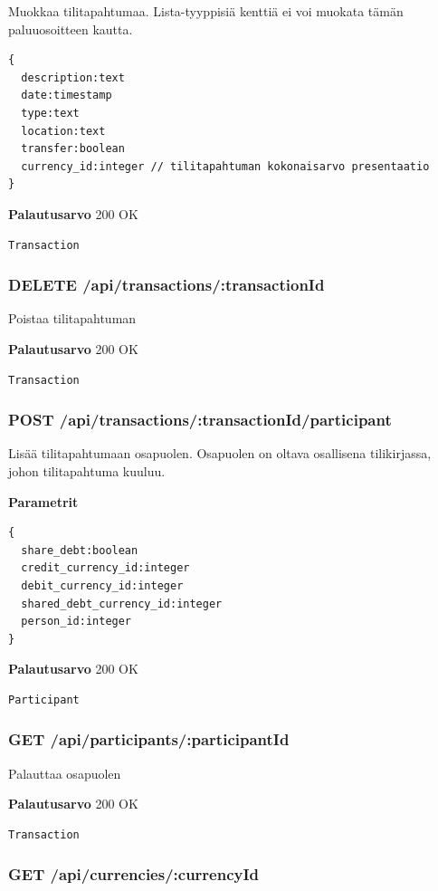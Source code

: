 \documentclass[a4paper,parskip=half]{scrartcl}
\begin{document}
Muokkaa tilitapahtumaa. Lista-tyyppisiä kenttiä ei voi muokata tämän
paluuosoitteen kautta.

\begin{Verbatim}
{
  description:text
  date:timestamp
  type:text
  location:text
  transfer:boolean
  currency_id:integer // tilitapahtuman kokonaisarvo presentaatio
}
\end{Verbatim}

\textbf{Palautusarvo}
200 OK
\begin{Verbatim}
Transaction
\end{Verbatim}

\subsubsection{DELETE /api/transactions/:transactionId}

Poistaa tilitapahtuman

\textbf{Palautusarvo}
200 OK
\begin{Verbatim}
Transaction
\end{Verbatim}

\subsubsection{POST /api/transactions/:transactionId/participant}

Lisää tilitapahtumaan osapuolen. Osapuolen on oltava osallisena tilikirjassa,
johon tilitapahtuma kuuluu.

\textbf{Parametrit}
\begin{Verbatim}
{
  share_debt:boolean
  credit_currency_id:integer
  debit_currency_id:integer
  shared_debt_currency_id:integer
  person_id:integer
}
\end{Verbatim}

\textbf{Palautusarvo}
200 OK
\begin{Verbatim}
Participant
\end{Verbatim}

\subsubsection{GET /api/participants/:participantId}

Palauttaa osapuolen

\textbf{Palautusarvo}
200 OK
\begin{Verbatim}
Transaction
\end{Verbatim}

\subsubsection{GET /api/currencies/:currencyId}
\end{document}
